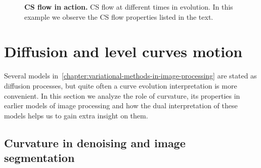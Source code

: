 \begin{figure}
\caption{\textbf{CS flow in action.} CS flow at different times in evolution. In this example we observe the CS flow properties listed in the text.}
\end{figure}



\section{Diffusion and level curves motion}
\label{ch3:sec:diffusion-level-curves-motion}

Several models in~\cref{chapter:variational-methods-in-image-processing} are stated as diffusion processes, but quite often a  curve evolution interpretation is more convenient. In this section we analyze the role of curvature, its properties in earlier models of image processing and how the dual interpretation of these models helps us to gain extra insight on them.

\subsection{Curvature in denoising and image segmentation}

